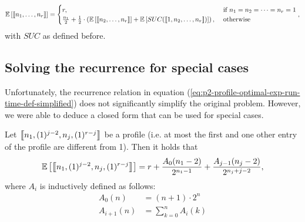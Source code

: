 \begin{equation}
  \label{eq:p2-profile-optimal-exp-run-time-def-simplified}
  \mathbb{E}\left[ \left\llbracket n_1, \dots, n_r \right\rrbracket \right] =
  \begin{cases}
    r, & \text{ if } n_1 = n_2 = \dots = n_r = 1 \\
    \frac{n_1}{2} + \frac{1}{2} \cdot \left( \mathbb{E}\left[ \left\llbracket n_2, \dots, n_r \right\rrbracket \right] + \mathbb{E}\left[ SUC(\left\llbracket 1,n_2,\dots,n_r \right\rrbracket) \right] \right) ,& \text{ otherwise }
  \end{cases},
\end{equation}
with $SUC$ as defined before.

\subsection{Solving the recurrence for special cases}
\label{sec:p2-profile-exp-runtime-closed-form-spec-cases}

Unfortunately, the recurrence relation in equation (\ref{eq:p2-profile-optimal-exp-run-time-def-simplified}) does not significantly simplify the original problem. However, we were able to deduce a closed form that can be used for special cases.

\begin{theorem}
  \label{theo:simple-profiles-exp-runtime-for-p2-hlf}
  Let $\left\llbracket n_1,(1)^{j-2},n_j,(1)^{r-j} \right\rrbracket$ be a profile 
  (i.e. at most the first and one other entry of the profile are different from 1).
  Then it holds that
  \begin{equation*}
    \mathbb{E}\left[ \left\llbracket n_1,(1)^{j-2},n_j,(1)^{r-j} \right\rrbracket \right] = 
    r + \frac{A_0(n_1-2)}{2^{n_1-1}} + \frac{A_{j-1}(n_j-2)}{2^{n_j+j-2}},
  \end{equation*}
  where $A_i$ is inductively defined as follows:
  \begin{align*}
    A_0(n) & = (n+1) \cdot 2^n \\
    A_{i+1}(n) & = \sum_{k=0}^n A_{i}(k)
  \end{align*}
\end{theorem}

